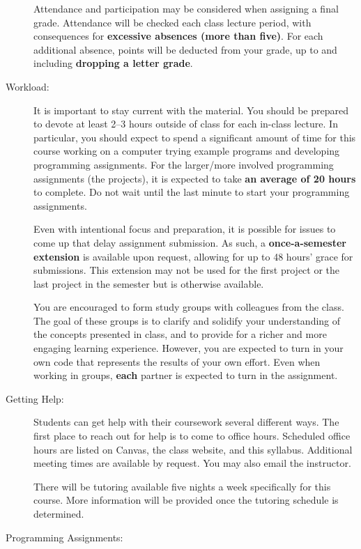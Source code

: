 \documentclass [letterpaper,11pt]{article}
\begin{document}
\begin{description}
Attendance and participation may be considered when assigning a final grade.
Attendance will be checked each class lecture period, with consequences for \textbf{excessive absences (more than five)}.  For each additional absence, points will be deducted from your grade, up to and including \textbf{dropping a letter grade}.


\item[Workload:]
It is important to stay current with the material.  You should be prepared to devote  at least 2--3 hours outside of class for each in-class lecture.  In particular, you should expect to spend a significant amount of time for this course working on a computer trying example programs and developing programming assignments. For the larger/more involved programming assignments (the projects), it is expected to take \textbf{an average of 20 hours} to complete. Do not wait until the last minute to start your programming assignments. 

Even with intentional focus and preparation, it is possible for issues to come up that delay assignment submission.  As such, a \textbf{once-a-semester extension} is available upon request, allowing for up to 48 hours' grace for submissions. This extension may not be used for the first project or the last project in the semester but is otherwise available.

You are encouraged to form study groups with colleagues from the class. The goal of these groups is to clarify and solidify your understanding of the concepts presented in class, and to provide for a richer and more engaging learning experience. However, you are expected to turn in your own code that represents the results of your own effort. Even when working in groups, \textbf{each} partner is expected to turn in the assignment.

\pagebreak

\item[Getting Help:]
Students can get help with their coursework several different ways.  The first place to reach out for help is to come to office hours.  Scheduled office hours are listed on Canvas, the class website, and this syllabus.  Additional meeting times are available by request.  You may also email the instructor.

There will be tutoring available five nights a week specifically for this course.  More information will be provided once the tutoring schedule is determined.

\item[Programming Assignments:]\


\end{description}
\end{document}
